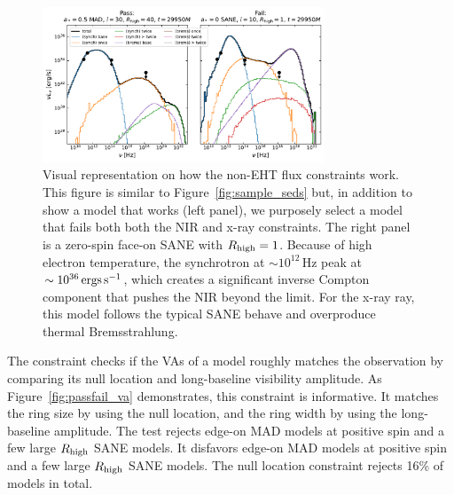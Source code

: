 \begin{figure}
  \centering
  \includegraphics[width=0.75\textwidth]{figures/passfail_sed.pdf}
  \caption{
    Visual representation on how the non-EHT flux constraints work.
    This figure is similar to Figure~\ref{fig:sample_seds} but, in
    addition to show a model that works (left panel), we purposely
    select a model that fails both both the NIR and x-ray constraints.
    The right panel is a zero-spin face-on SANE with $R_\mathrm{high} = 1$.
    Because of high electron temperature, the synchrotron at $\sim
    10^{12}\,\mathrm{Hz}$ peak at $\sim 10^{36}\,\mathrm{ergs\,s^{-1}}$, which creates
    a significant inverse Compton component that pushes the NIR beyond
    the limit.
    For the x-ray ray, this model follows the typical SANE behave and
    overproduce thermal Bremsstrahlung.}
  \label{fig:passfail_sed}
\end{figure}



The \vam constraint checks if the VAs of a model roughly matches the
observation by comparing its null location and long-baseline visibility
amplitude.
As Figure~\ref{fig:passfail_va} demonstrates, this constraint is
informative.
It matches the ring size by using the null location, and the ring
width by using the long-baseline amplitude.
The test rejects edge-on MAD models at positive spin and a few large
$R_\mathrm{high}$ SANE models.
It disfavors edge-on MAD models at positive spin and a few large $R_\mathrm{high}$
SANE models.
The null location constraint rejects 16\% of models in total.

